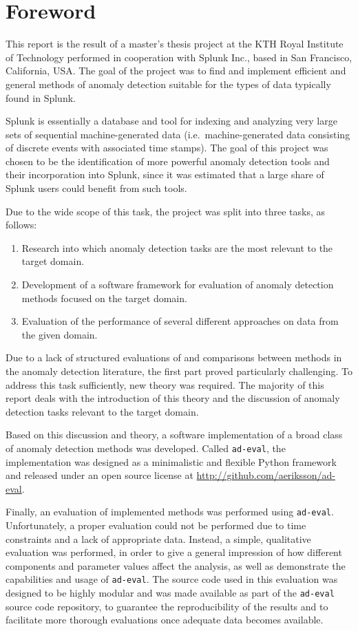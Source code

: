 \chapter*{Foreword}

This report is the result of a master's thesis project at the KTH Royal Institute of Technology performed in cooperation with Splunk Inc.\@, based in San Francisco, California, USA\@. The goal of the project was to find and implement efficient and general methods of anomaly detection suitable for the types of data typically found in Splunk.

Splunk is essentially a database and tool for indexing and analyzing very large sets of sequential machine-generated data (i.e.\ machine-generated data consisting of discrete events with associated time stamps). The goal of this project was chosen to be the identification of more powerful anomaly detection tools and their incorporation into Splunk, since it was estimated that a large share of Splunk users could benefit from such tools.

Due to the wide scope of this task, the project was split into three tasks, as follows:
\begin{enumerate}
    \item Research into which anomaly detection tasks are the most relevant to the target domain.
    \item Development of a software framework for evaluation of anomaly detection methods focused on the target domain.
    \item Evaluation of the performance of several different approaches on data from the given domain.
\end{enumerate}

Due to a lack of structured evaluations of and comparisons between methods in the anomaly detection literature, the first part proved particularly challenging. To address this task sufficiently, new theory was required. The majority of this report deals with the introduction of this theory and the discussion of anomaly detection tasks relevant to the target domain.

Based on this discussion and theory, a software implementation of a broad class of anomaly detection methods was developed. Called \texttt{ad-eval}, the implementation was designed as a minimalistic and flexible Python framework and released under an open source license at \url{http://github.com/aeriksson/ad-eval}.

Finally, an evaluation of implemented methods was performed using \texttt{ad-eval}. Unfortunately, a proper evaluation could not be performed due to time constraints and a lack of appropriate data. Instead, a simple, qualitative evaluation was performed, in order to give a general impression of how different components and parameter values affect the analysis, as well as demonstrate the capabilities and usage of \texttt{ad-eval}. The source code used in this evaluation was designed to be highly modular and was made available as part of the \texttt{ad-eval} source code repository, to guarantee the reproducibility of the results and to facilitate more thorough evaluations once adequate data becomes available.
